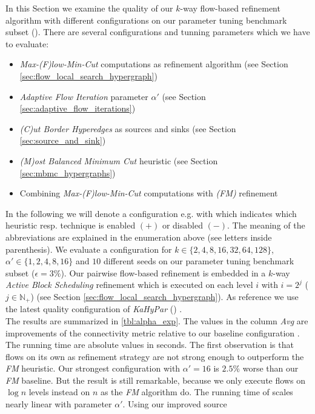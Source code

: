 In this Section we examine the quality of our $k$-way flow-based refinement algorithm with
different configurations on our parameter tuning benchmark subset ().
There are several configurations and tunning parameters which we have to evaluate:
\begin{itemize}
\item \emph{Max-(F)low-Min-Cut} computations as refinement algorithm (see Section \ref{sec:flow_local_search_hypergraph})
\item \emph{Adaptive Flow Iteration} parameter $\alpha'$ (see Section \ref{sec:adaptive_flow_iterations})
\item \emph{(C)ut Border Hyperedges} as sources and sinks (see Section \ref{sec:source_and_sink})
\item \emph{(M)ost Balanced Minimum Cut} heuristic (see Section \ref{sec:mbmc_hypergraphs})
\item Combining \emph{Max-(F)low-Min-Cut} computations with \emph{(FM)} refinement
\end{itemize}
In the following we will denote a configuration e.g. with \FlowVariant{+}{-}{-}{-} which indicates
which heuristic resp. technique is enabled $(+)$ or disabled $(-)$. The meaning of the 
abbreviations are explained in the enumeration above (see letters inside parenthesis). We evaluate
a configuration for $k \in \{2,4,8,16,32,64,128\}$, $\alpha' \in \{1,2,4,8,16\}$
and $10$ different seeds on our parameter tuning benchmark subset ($\epsilon = 3\%$). 
Our pairwise flow-based refinement is embedded in a $k$-way \emph{Active Block Scheduling}
refinement which is executed on each level $i$ with $i = 2^j$ ($j \in \mathbb{N}_+$) 
(see Section \ref{sec:flow_local_search_hypergraph}). As reference we use the 
latest quality configuration of \emph{KaHyPar} () \cite{heuer2017improving}. \\
The results are summarized in \autoref{tbl:alpha_exp}. The values
in the column \emph{Avg} are improvements of the connectivity metric
relative to our baseline configuration \FlowVariant{-}{-}{-}{+}. The running
time are absolute values in seconds. The first observation is that flows on
its own as refinement strategy are not strong enough to outperform the
\emph{FM} heuristic. Our strongest configuration with $\alpha' = 16$
is $2.5\%$ worse than our \emph{FM} baseline. But the result 
is still remarkable, because we only execute flows on $\log{n}$ levels
instead on $n$ as the \emph{FM} algorithm do. The running time of
scales nearly linear with parameter $\alpha'$. Using our improved source 
